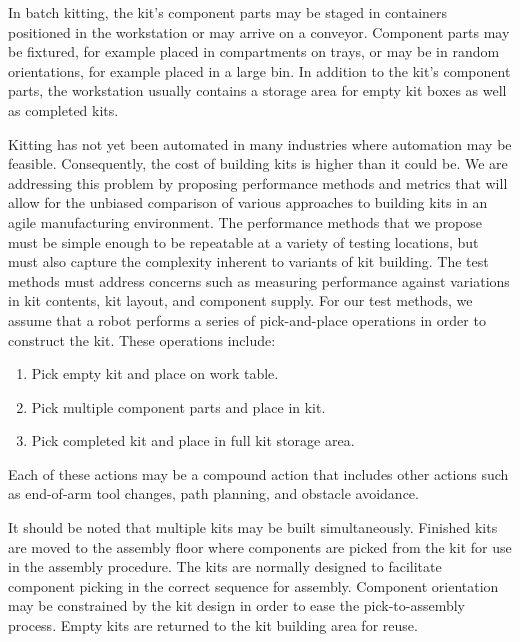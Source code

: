 In batch kitting, the kit's component parts may be staged in containers positioned in the workstation or may arrive on a conveyor.
Component parts may be fixtured, for example placed in compartments on trays, or may be in random orientations, for example
placed in a large bin. In addition to the kit's component parts, the workstation usually contains a storage area for empty kit boxes as
well as completed kits.

Kitting has not yet been automated in many industries where automation may be feasible. Consequently, the cost of building kits is higher than it could be. We are addressing this problem by proposing performance methods and metrics that will allow for the unbiased comparison of 
various approaches to building kits  in an agile manufacturing environment. The performance methods that we propose must be simple enough to be repeatable at a variety of 
testing locations, but must also capture the complexity inherent to variants of kit building. The test methods must address concerns such as
measuring performance against variations in kit contents, kit layout, and component supply.
For our test methods, we assume that a robot performs a series of pick-and-place operations
in order to construct the kit. These operations include:
\begin{enumerate}
\item Pick empty kit and place on work table.
\item Pick multiple component parts and place in kit.
\item Pick completed kit and place in full kit storage area.
\end{enumerate}
Each of these actions may be a compound action that includes other actions such as end-of-arm tool changes, path planning,
and obstacle avoidance.

It should be noted that multiple kits may be built simultaneously. Finished kits are moved to the assembly floor where components
are picked
from the kit for use in the assembly procedure. The kits are normally designed to facilitate component picking in the correct
sequence for assembly. Component orientation may be constrained by the kit design in order to ease the pick-to-assembly process.
Empty kits are returned to the kit building area for reuse.


